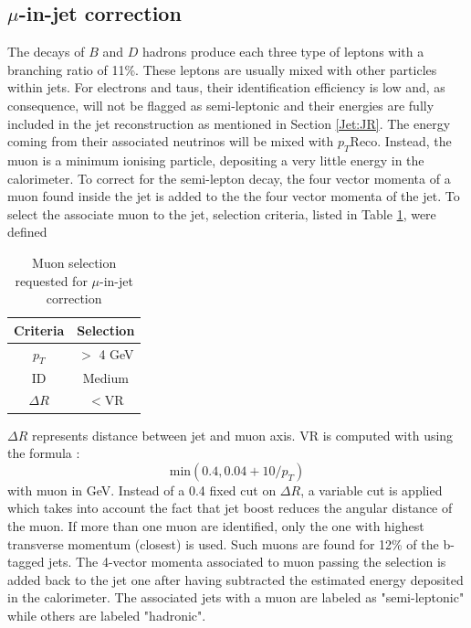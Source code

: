 \subsection{$\mu$-in-jet correction}
\label{Jet:Cal:BCal:MuInJet}
The decays of $B$ and $D$ hadrons produce each three type of leptons with a branching ratio of 11\%. These leptons are usually mixed with other particles within jets. For electrons and taus, their identification efficiency is low and, as consequence, will not be flagged as semi-leptonic and their energies are fully included in the jet reconstruction as mentioned in Section \ref{Jet:JR}. The energy coming from their associated neutrinos will be mixed with $p_T$Reco. Instead, the muon is a minimum ionising particle, depositing a very little energy in the calorimeter. To correct for the semi-lepton decay, the four vector momenta of a muon found inside the jet is added to the the four vector momenta of the jet. To select the associate muon to the jet, selection criteria, listed in Table \ref{tab:Jet:Cal:BCal:MuInJet:Sel}, were defined 
\begin{table}[ht]
    \centering
    \begin{tabular}{cc}
       \hline\hline
        Criteria & Selection \\
        \hline
        $p_T$ & $>$ 4 GeV \\
         ID & Medium \\
         $\Delta R$ &  $<$VR\\
         \hline
         \hline
    \end{tabular}
    \caption{Muon selection requested for $\mu$-in-jet correction}
    \label{tab:Jet:Cal:BCal:MuInJet:Sel}
\end{table}
$\Delta R$ represents distance between jet and muon axis. VR is computed with using the formula :
\begin{equation}
    \mathrm{min}(0.4, 0.04+10/p_T)
\end{equation}
with muon \pT in GeV. Instead of a 0.4 fixed cut on $\Delta R$, a variable cut is applied which takes into account the fact that jet boost reduces the angular distance of the muon. If more than one muon are identified, only the one with highest transverse momentum (closest) is used. Such muons are found for 12\% of the b-tagged jets. The 4-vector momenta associated to muon passing the selection is added back to the jet one after having subtracted the estimated energy deposited in the calorimeter. The associated jets with a muon are labeled as "semi-leptonic" while others are labeled "hadronic".

